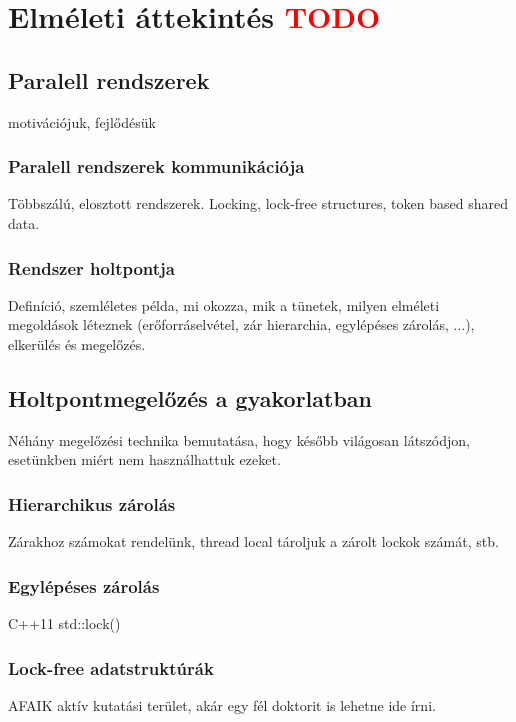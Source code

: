 \chapter{Elméleti áttekintés \textcolor{red}{TODO}}

\section{Paralell rendszerek} motivációjuk, fejlődésük %
    \subsection{Paralell rendszerek kommunikációja} 
        Többszálú, elosztott rendszerek. Locking, lock-free structures, token based shared data.
    \subsection{Rendszer holtpontja} Definíció, szemléletes példa, mi okozza, mik a tünetek, milyen elméleti megoldások léteznek (erőforráselvétel, zár hierarchia, egylépéses zárolás, ...), elkerülés és megelőzés.

\section{Holtpontmegelőzés a gyakorlatban} Néhány megelőzési technika bemutatása, hogy később világosan látszódjon, esetünkben miért nem használhattuk ezeket.

    \subsection{Hierarchikus zárolás} Zárakhoz számokat rendelünk, thread local tároljuk a zárolt lockok számát, stb.
    \subsection{Egylépéses zárolás} C++11 std::lock()
    \subsection{Lock-free adatstruktúrák} AFAIK aktív kutatási terület, akár egy fél doktorit is lehetne ide írni.
